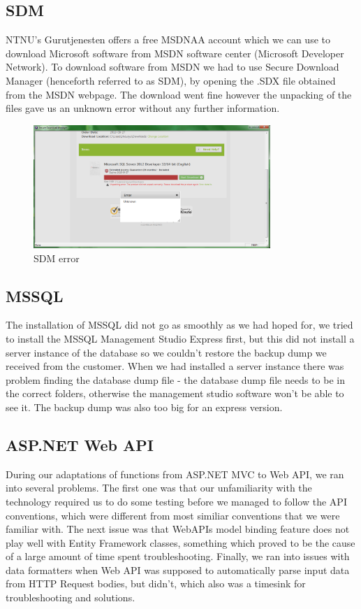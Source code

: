 \subsection{SDM}
NTNU's Gurutjenesten offers a free MSDNAA account which we can use to download Microsoft software from MSDN software center (Microsoft Developer Network). To download software from MSDN we had to use Secure Download Manager (henceforth referred to as SDM), by opening the .SDX file obtained from the MSDN webpage. The download went fine however the unpacking of the files gave us an unknown error without any further information.
\begin{figure}[H]
\centering
\includegraphics[width=0.8\textwidth]{images/issue00.png}
\caption{SDM error}
\label{fig:SDM_error}
\end{figure}

\subsection{MSSQL}
The installation of MSSQL did not go as smoothly as we had hoped for, we tried to install the MSSQL Management Studio Express first, but this did not install a server instance of the database so we couldn't restore the backup dump we received from the customer. When we had installed a server instance there was problem finding the database dump file - the database dump file needs to be in the correct folders, otherwise the management studio software won't be able to see it. The backup dump was also too big for an express version.

\subsection{ASP.NET Web API}
\label{subsubsec:webapiissues}
During our adaptations of functions from ASP.NET MVC to Web API, we ran into several problems. The first one was that our unfamiliarity with the technology required us to do some testing before we managed to follow the API conventions, which were different from most similiar conventions that we were familiar with.
The next issue was that WebAPIs model binding feature does not play well with Entity Framework classes, something which proved to be the cause of a large amount of time spent troubleshooting.
Finally, we ran into issues with data formatters when Web API was supposed to automatically parse input data from HTTP Request bodies, but didn't, which also was a timesink for troubleshooting and solutions.

